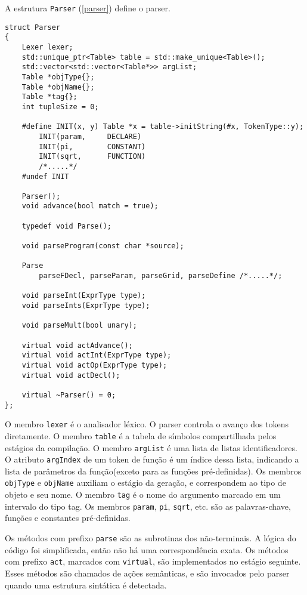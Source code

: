 \newpage
A estrutura \texttt{Parser} (\ref{parser}) define o parser.

\begin{lstlisting}[caption=Estrutura parcial do parser, label=parser]
struct Parser
{
    Lexer lexer;
    std::unique_ptr<Table> table = std::make_unique<Table>();
    std::vector<std::vector<Table*>> argList;
    Table *objType{};
    Table *objName{};
    Table *tag{};
    int tupleSize = 0;

    #define INIT(x, y) Table *x = table->initString(#x, TokenType::y);
        INIT(param,     DECLARE)
        INIT(pi,        CONSTANT)
        INIT(sqrt,      FUNCTION)
        /*.....*/
    #undef INIT

    Parser();
    void advance(bool match = true);

    typedef void Parse();

    void parseProgram(const char *source);

    Parse 
        parseFDecl, parseParam, parseGrid, parseDefine /*.....*/;

    void parseInt(ExprType type);
    void parseInts(ExprType type);

    void parseMult(bool unary);

    virtual void actAdvance();
    virtual void actInt(ExprType type);
    virtual void actOp(ExprType type);
    virtual void actDecl();

    virtual ~Parser() = 0;
};
\end{lstlisting}

O membro \texttt{lexer} é o analisador léxico.
O parser controla o avanço dos tokens diretamente.
O membro \texttt{table} é a tabela de símbolos compartilhada
pelos estágios da compilação.
O membro \texttt{argList} é uma lista de listas identificadores.
O atributo \texttt{argIndex} de um token de função é um índice dessa lista,
indicando a lista de parâmetros da função(exceto para as funções pré-definidas).
Os membros \texttt{objType} e \texttt{objName} auxiliam o estágio da geração,
e correspondem ao tipo de objeto e seu nome.
O membro \texttt{tag} é o nome do argumento marcado em um intervalo do tipo tag.
Os membros \texttt{param}, \texttt{pi}, \texttt{sqrt}, etc. são
as palavras-chave, funções e constantes pré-definidas.

Os métodos com prefixo \texttt{parse} são as subrotinas dos não-terminais.
A lógica do código foi simplificada, então não há uma correspondência exata.
Os métodos com prefixo \texttt{act}, marcados com \texttt{virtual},
são implementados no estágio seguinte.
Esses métodos são chamados de ações semânticas,
e são invocados pelo parser quando uma estrutura sintática é detectada.

